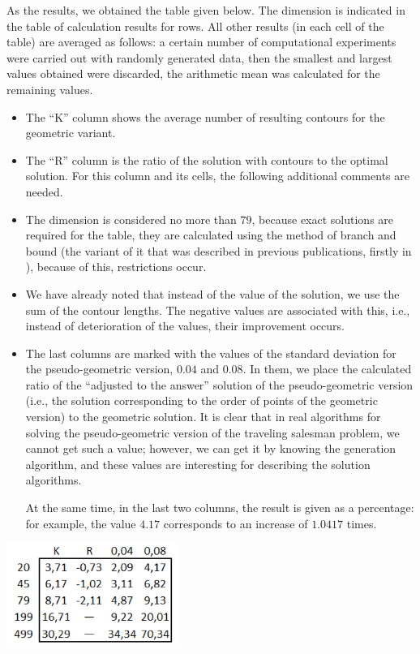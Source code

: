 \documentclass[12pt]{llncs}
\begin{document}
As the results,
we obtained the table given below.
The dimension 
is indicated in the table of calculation results for rows. 
All other results (in each cell of the table) 
are averaged as follows: 
a certain number of computational experiments 
were carried out with randomly generated data,
then the smallest and largest values obtained were discarded, 
the arithmetic mean was calculated for the remaining values. 


\begin{itemize}
\item 
The ``K'' column 
shows the average number of resulting contours 
for the geometric variant.
\item 
The ``R'' column is the ratio of the solution
with contours to the optimal solution.
For this column and its cells, 
the following additional comments are needed.
\item The dimension is considered no more than $79$, 
because exact solutions are required for the table, 
they are calculated using the method of branch and bound 
(the variant of it that was described in previous publications,
firstly in \cite{KIO-2021}),
because of this, restrictions occur.
\item We have already noted 
that instead of the value of the solution, 
we use the sum of the contour lengths.
The negative values are associated with this, 
i.e., instead of deterioration of the values, 
their improvement occurs.
\item 
The last columns are marked with the values 
of the standard deviation for the pseudo-geometric version,
$0.04$ and $0.08$. 
In them, we place the calculated ratio 
of the ``adjusted to the answer'' solution
of the pseudo-geometric version 
(i.e., the solution corresponding to the order of points 
of the geometric version) 
to the geometric solution. 
It is clear that in real algorithms 
for solving the pseudo-geometric version 
of the traveling salesman problem, 
we cannot get such a value; 
however, we can get it by knowing the generation algorithm, 
and these values are interesting 
for describing the solution algorithms.
\par
At the same time, in the last two columns, 
the result is given as a percentage: 
for example, the value $4.17$
corresponds to an increase of $1.0417$ times.
\end{itemize}

\begin{table}[h!tb]
\centering
\includegraphics[width=0.42\textwidth]{poso-04.png}
\label{table-1}
\end{table}
\end{document}
